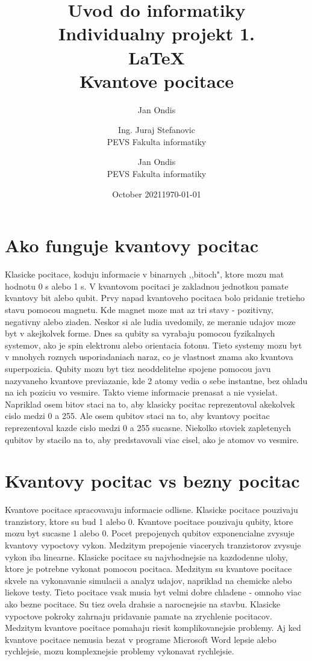 \documentclass[year=2021]{article}
\date{October 2021}
\author{Jan Ondis}
\title{Uvod do informatiky\\
\bigbreak
\bigbreak
\bigbreak
\bigbreak
\bigbreak
\bigbreak
\bigbreak
\bigbreak
\bigbreak
\bigbreak
\bigbreak
\bigbreak
\bigbreak
\bigbreak
\bigbreak
\bigbreak
\bigbreak
\bigbreak
  Individualny projekt 1.
  \\\LaTeX{} \\
  Kvantove pocitace
\bigbreak
\bigbreak
\bigbreak
\bigbreak
\bigbreak
\bigbreak
\bigbreak
\bigbreak
\bigbreak
\bigbreak
\bigbreak
\bigbreak
\bigbreak
\bigbreak
\bigbreak
\bigbreak
}
\author{Ing. Juraj Stefanovic  \\
	PEVS Fakulta informatiky  \\
	\and
	Jan Ondis \\
	PEVS Fakulta informatiky \\
	}
\date{\today}
\begin{document}
\maketitle

\section{Ako funguje kvantovy pocitac}
\bigbreak
Klasicke pocitace, koduju informacie v binarnych ,,bitoch", ktore mozu mat hodnotu 0 s alebo 1 s. V kvantovom pocitaci je zakladnou jednotkou pamate kvantovy bit alebo qubit.
\bigbreak
Prvy napad kvantoveho pocitaca bolo pridanie tretieho stavu pomocou magnetu.
Kde magnet moze mat az tri stavy - pozitivny, negativny alebo ziaden. Neskor si ale ludia uvedomily, ze meranie udajov moze byt v akejkolvek forme. Dnes sa qubity sa vyrabaju pomocou fyzikalnych systemov, ako je spin elektronu alebo orientacia fotonu. Tieto systemy mozu byt v mnohych roznych usporiadaniach naraz, co je vlastnost znama ako kvantova superpozicia. Qubity mozu byt tiez neoddelitelne spojene pomocou javu nazyvaneho kvantove previazanie, kde 2 atomy vedia o sebe instantne, bez ohladu na ich poziciu vo vesmire. Takto vieme informacie prenasat a nie vysielat.
\bigbreak
Napriklad osem bitov staci na to, aby klasicky pocitac reprezentoval akekolvek cislo medzi 0 a 255. Ale osem qubitov staci na to, aby kvantovy pocitac reprezentoval kazde cislo medzi 0 a 255 sucasne. Niekolko stoviek zapletenych qubitov by stacilo na to, aby predstavovali viac cisel, ako je atomov vo vesmire.

\section{Kvantovy pocitac vs bezny pocitac}
Kvantove pocitace spracovavaju informacie odlisne. Klasicke pocitace pouzivaju tranzistory, ktore su bud 1 alebo 0. Kvantove pocitace pouzivaju qubity, ktore mozu byt sucasne 1 alebo 0. Pocet prepojenych qubitov exponencialne zvysuje kvantovy vypoctovy vykon. Medzitym prepojenie viacerych tranzistorov zvysuje vykon iba linearne.
\bigbreak
Klasicke pocitace su najvhodnejsie na kazdodenne ulohy, ktore je potrebne vykonat pomocou pocitaca. Medzitym su kvantove pocitace skvele na vykonavanie simulacii a analyz udajov, napriklad na chemicke alebo liekove testy. Tieto pocitace vsak musia byt velmi dobre chladene - omnoho viac ako bezne pocitace. Su tiez ovela drahsie a narocnejsie na stavbu.
\bigbreak
Klasicke vypoctove pokroky zahrnaju pridavanie pamate na zrychlenie pocitacov. Medzitym kvantove pocitace pomahaju riesit komplikovanejsie problemy. Aj ked kvantove pocitace nemusia bezat v programe Microsoft Word lepsie alebo rychlejsie, mozu komplexnejsie problemy vykonavat rychlejsie.
\bigbreak
\end{document}
